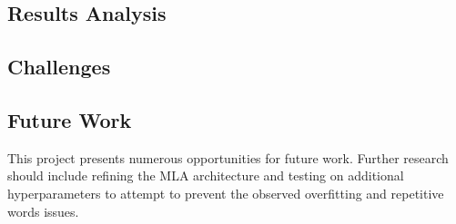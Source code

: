 
\subsection{Results Analysis}

\subsection{Challenges}


\subsection{Future Work}
This project presents numerous opportunities for future work. 
Further research should include refining the MLA architecture and testing on additional hyperparameters to attempt to prevent the observed overfitting and repetitive words issues.